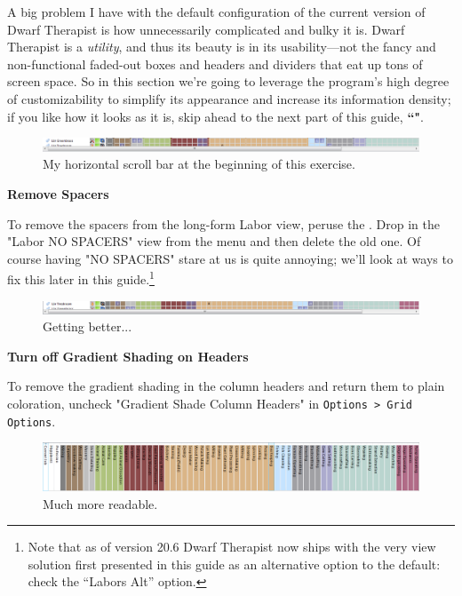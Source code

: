 \documentclass[]{article}
\begin{document}
A big problem I have with the default configuration of the current version of Dwarf Therapist is how
unnecessarily complicated and bulky it is. Dwarf Therapist is a \emph{utility}, and thus its beauty is in
its usability---not the fancy and non-functional faded-out boxes and headers and dividers that eat up
tons of screen space. So in this section we're going to leverage the program's high degree of
customizability to simplify its appearance and increase its information density; if you like how it looks
as it is, skip ahead to the next part of this guide, \textbf{``"}.

\begin{figure}[h!] \centering
\includegraphics[width=\linewidth]{Sec2Fig18}
\caption{My horizontal scroll bar at the beginning of this exercise.}
\end{figure}

\noindent \textbf{Remove Spacers}

To remove the spacers from the long-form Labor view, peruse the \textbf{}. Drop
in the "Labor NO SPACERS" view from the menu and then delete the old one. Of course having "NO SPACERS"
stare at us is quite annoying; we'll look at ways to fix this later in this guide.\footnote{Note that as
of version 20.6 Dwarf Therapist now ships with the very view solution first presented in this guide as
an alternative option to the default: check the ``Labors Alt'' option.} \begin{figure}[h!]
\centering
\includegraphics[width=\linewidth]{Sec2Fig19}
\caption{Getting better...}
\end{figure}

\noindent \textbf{Turn off Gradient Shading on Headers}

To remove the gradient shading in the column headers and return them to plain coloration, uncheck
"Gradient Shade Column Headers" in \texttt{Options > Grid Options}.
\begin{figure}[h!] \centering
\includegraphics[width=\linewidth]{Sec2Fig20}
\caption{Much more readable.}
\end{figure}
\end{document}
